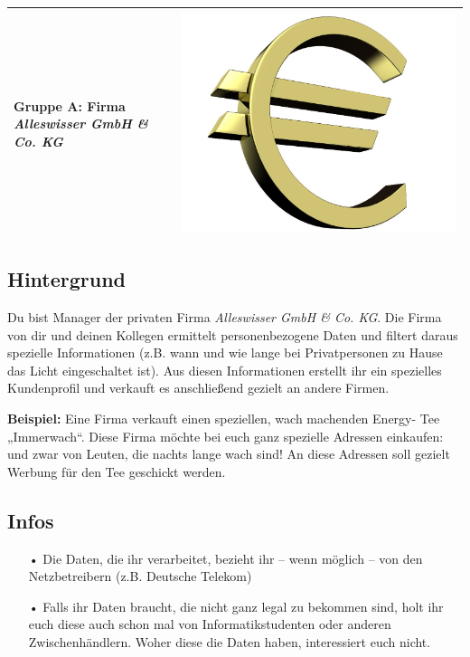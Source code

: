 \documentclass[11pt,a4paper,DIV=10,parskip=half,BCOR=0mm]{scrartcl}
\begin{document}
%
\setlength{\tabcolsep}{0mm} %
\begin{tabularx}{\linewidth}{lXr}
{\Large\textsf{\textbf{Gruppe A:} Firma \textit{Alleswisser GmbH \& Co. KG}}} & &
\includegraphics[scale=0.04]{images/euro}\\ %
\hline
\end{tabularx}
%
\subsection*{Hintergrund}
Du bist Manager der privaten Firma \textit{Alleswisser GmbH \& Co. KG}.
Die Firma von dir und deinen Kollegen ermittelt  personenbezogene Daten und filtert daraus spezielle Informationen (z.B. wann und wie lange bei
Privatpersonen zu Hause das Licht eingeschaltet ist). Aus diesen
Informationen erstellt ihr ein spezielles Kundenprofil und verkauft es
anschließend gezielt an andere Firmen.

\textbf{Beispiel: }Eine Firma verkauft einen speziellen, wach machenden Energy-
Tee „Immerwach“. Diese Firma möchte bei euch ganz spezielle Adressen
einkaufen: und zwar von Leuten, die nachts lange wach sind! An diese
Adressen soll gezielt Werbung für den Tee geschickt werden.
\subsection*{Infos}
\begin{enumerate}
	\item[•]Die Daten, die ihr verarbeitet, bezieht ihr -- wenn möglich -- von den Netzbetreibern (z.B.
	Deutsche Telekom)
	\item[•]Falls ihr Daten braucht, die nicht ganz legal zu bekommen sind, holt
	ihr euch diese auch schon mal von Informatikstudenten oder
	anderen Zwischenhändlern. Woher diese die Daten haben,
	interessiert euch nicht.
\end{enumerate}
\end{document}

